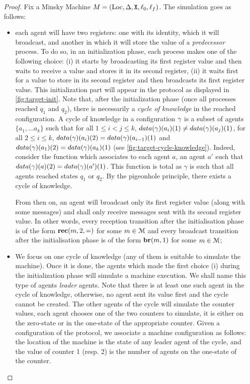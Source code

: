 \begin{proof}
	
	
	
	Fix a Minsky Machine $M= (\text{Loc}, \Delta, \mathtt{X}, \ell_0, \ell_f)$. The simulation goes as follows: 
	\begin{itemize}
		\item each agent will have two registers: one with its identity, which it will broadcast, and another in which it will store the value of a \emph{predecessor} process. To do so, in an initialization phase, each process makes one of the following choice: (i) it starts by broadcasting its first register value and then waits to receive a value and stores it in its second register, (ii) it waits first for a value to store in its second register and then broadcasts its first register value. This initialization part will appear in the protocol as displayed in \cref{fig:target-init}. Note that, after the initialization phase (once all processes reached $q_1$ and $q_2$), there is necessarily a \emph{cycle of knowledge} in the reached configuration. A cycle of knowledge in a configuration $\gamma$ is a subset of agents $\{a_1, \dots a_k\}$ such that for all $1 \leq i < j \leq k$, $\data{\config}(a_i)(1) \ne \data{\config}(a_j)(1)$, for all $2 \leq i \leq k$, $\data{\config}(a_i)(2) = \data{\config}(a_{i-1})(1)$ and $\data{\config}(a_1)(2) = \data{\config}(a_{k})(1)$ (see \cref{fig:target-cycle-knowledge}). Indeed, consider the function which associates to each agent $a$, an agent $a'$ such that $\data{\config}(a)(2) = \data{\config}(a')(1)$. This function is total as $\gamma$ is such that all agents reached states $q_1$ or $q_2$. By the pigeonhole principle, there exists a cycle of knowledge.
		
		From then on, an agent will broadcast only its first register value (along with some messages) and shall only receive messages sent with its second register value. In other words, every reception transition after the initialisation phase is of the form $\textbf{rec}(m, 2, =)$ for some $m \in \mathcal{M}$ and every broadcast transition after the initialisation  phase is of the form $\textbf{br}(m, 1)$ for some $m \in \mathcal{M}$;
		
		\item We focus on one cycle of knowledge (any of them is suitable to simulate the machine). Once it is done, the agents which made the first choice (i) during the initialization phase will simulate a machine execution. We shall name this type of agents \emph{leader} agents. Note that there is at least one such agent in the cycle of knowledge, otherwise, no agent sent its value first and the cycle cannot be created. 
		The other agents of the cycle will simulate the counter values, each agent chooses one of the two counters to simulate, it is either on the zero-state or in the one-state of the appropriate counter. Given a configuration of the protocol, we associate a machine configuration as follows: the location of the machine is the state of any leader agent of the cycle, and the value of counter 1 (resp. 2) is the number of agents on the one-state of the counter.
		

\end{itemize}
\end{proof}
